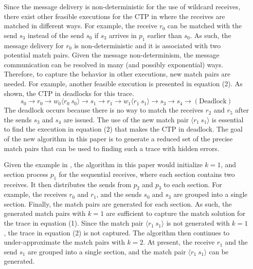
Since the message delivery is non-deterministic for the use of wildcard receives, there exist other feasible executions for the CTP in  where the receives are matched in different ways. For example,  the receive $r_0$ can be matched with the send $s_3$ instead of the send $s_0$ if $s_3$ arrives in $p_1$ earlier than $s_0$. As such, the message delivery for $r_0$ is non-deterministic and it is associated with two potential match pairs. 
Given the message non-determinism, the message communication can be resolved in many (and possibly exponential) ways. 
Therefore, to capture the behavior in other executions, new match pairs are needed.
For example, another feasible execution is presented in equation (2). As shown, the CTP in  deadlocks for this trace. 
\begin{equation}
s_0\rightarrow r_0\rightarrow w_0\langle r_0\ s_0\rangle \rightarrow s_1\rightarrow r_1\rightarrow w_1\langle r_1\ s_1\rangle \rightarrow s_3\rightarrow s_4 \rightarrow (\mathrm{Deadlock})
\end{equation} 
The deadlock occurs because there is no way to match the receives $r_2$ and $r_5$ after the sends $s_3$ and $s_4$ are issued. The use of the new match pair $\langle r_1\ s_1\rangle$ is essential to find the execution in equation (2) that makes the CTP in  deadlock.
The goal of the new algorithm in this paper is to generate a reduced set of the precise match pairs that can be used to finding such a trace with hidden errors.

Given the example in , the algorithm in this paper would initialize $k=1$, and section process $p_1$ for the sequential receives, where each section contains two receives. It then distributes the sends from $p_2$ and $p_3$ to each section. For example, the receives $r_0$ and $r_1$, and the sends $s_0$ and $s_3$ are grouped into a single section. Finally, the match pairs are generated for each section. 
As such, the generated match pairs with $k=1$ are sufficient to capture the match solution for the trace in equation (1). Since the match pair $\langle r_1\ s_1\rangle$ is not generated with $k=1$, the trace in equation (2) is not captured. The algorithm then continues to under-approximate the match pairs with $k=2$. At present, the receive $r_1$ and the send $s_1$ are grouped into a single section, and the match pair $\langle r_1\ s_1\rangle$ can be generated.

